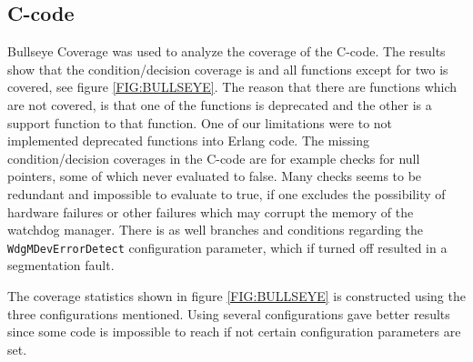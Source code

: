 \subsection{C-code}
Bullseye Coverage was used to analyze the coverage of the C-code. The
results show that the condition/decision coverage is {\bullseyecoverage}
and all functions except for two is covered, see figure
\ref{FIG:BULLSEYE}. The reason that there are functions which are not
covered, is that one of the functions is deprecated and the other is a
support function to that function. One of our limitations were to not
implemented deprecated functions into Erlang code.  The missing
condition/decision coverages in the C-code are for example checks for
null pointers, some of which never evaluated to false. Many checks
seems to be redundant and impossible to evaluate to true, if one
excludes the possibility of hardware failures or other failures which
may corrupt the memory of the watchdog manager. There is as well
branches and conditions regarding the \lstinline!WdgMDevErrorDetect!
configuration parameter, which if turned off resulted in a
segmentation fault.

The coverage statistics shown in figure \ref{FIG:BULLSEYE} is
constructed using the three configurations mentioned. Using several configurations
gave better results since some code is impossible to reach if not
certain configuration parameters are set.

